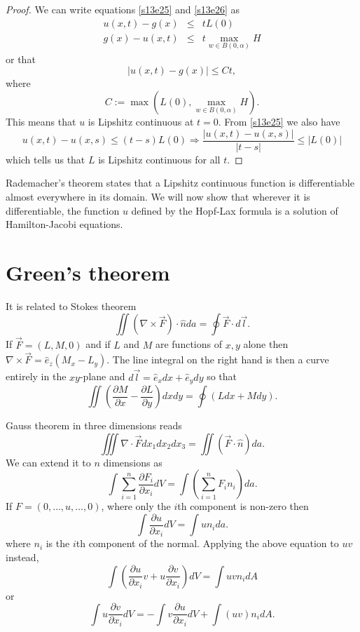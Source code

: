 \documentclass{article}
\newcommand{\pd}[2]{\frac{\partial{#1}}{\partial{#2}}}
\theoremstyle{plain}
\numberwithin{thm}{section}
\theoremstyle{plain}
\numberwithin{prop}{section}
\theoremstyle{definition}
\numberwithin{defn}{section}
\theoremstyle{remark}
\numberwithin{equation}{section}
\begin{document}
\begin{proof}
We can write equations \eqref{s13e25} and \eqref{s13e26} as
\begin{eqnarray*}
u(x, t) - g(x) &\le& tL(0) \\
g(x) - u(x, t) &\le& t\max_{w \in B(0, \alpha)}H
\end{eqnarray*}
or that
\begin{equation}\label{s13e27}
|u(x, t) - g(x)| \le Ct,
\end{equation}
where 
\[
C := \max\left(L(0), \max_{w \in B(0, \alpha)}H\right).
\]
This means that $u$ is Lipshitz continuous at $t = 0$. From \eqref{s13e25} we also have
\[
u(x, t) - u(x, s) \le (t - s)L(0) \Rightarrow \frac{|u(x, t) - u(x, s)|}{|t - s|} \le |L(0)|
\]
which tells us that $L$ is Lipshitz continuous for all $t$.
\end{proof}

Rademacher's theorem states that a Lipshitz continuous function is differentiable almost everywhere
in its domain. We will now show that wherever it is differentiable, the function $u$ defined by the
Hopf-Lax formula is a solution of Hamilton-Jacobi equations.

\section{Green's theorem}\label{s14}
It is related to Stokes theorem
\begin{equation}\label{s14e1}
\iint (\nabla \times \vec{F})\cdot \hat{n}da = \oint\vec{F} \cdot d\vec{l}.
\end{equation}
If $\vec{F} = (L, M, 0)$ and if $L$ and $M$ are functions of $x, y$ alone then $\nabla\times\vec{F} = 
\hat{e}_z (M_x - L_y)$. The line integral on the right hand is then a curve entirely in the $xy$-plane
and $d\vec{l} = \hat{e}_xdx + \hat{e}_ydy$ so that
\begin{equation}\label{s14e2}
\iint \left(\pd{M}{x} - \pd{L}{y}\right)dxdy = \oint \left(Ldx + Mdy\right).
\end{equation}

Gauss theorem in three dimensions reads
\begin{equation}\label{s14e3}
\iiint \nabla\cdot\vec{F}dx_1dx_2dx_3 = \iint (\vec{F}\cdot\hat{n})da.
\end{equation}
We can extend it to $n$ dimensions as
\begin{equation}\label{s14e4}
\int \sum_{i=1}^n\pd{F_i}{x_i}dV = \int \left(\sum_{i=1}^n F_in_i\right) da.
\end{equation}
If $F = (0, \ldots, u, \ldots, 0)$, where only the $i$th component is non-zero then
\begin{equation}\label{s14e5}
\int \pd{u}{x_i}dV = \int u n_i da.
\end{equation}
where $n_i$ is the $i$th component of the normal. Applying the above equation to $uv$ instead,
\[
\int \left(\pd{u}{x_i}v + u\pd{v}{x_i}\right)dV = \int uv n_i dA
\]
or 
\begin{equation}\label{s14e6}
\int u\pd{v}{x_i} dV = -\int v \pd{u}{x_i} dV + \int (uv) n_i dA.
\end{equation}
\end{document}

